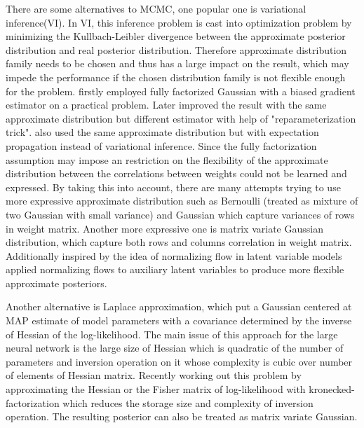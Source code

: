 There are some alternatives to MCMC, one popular one is variational inference(VI)\cite{hinton1993keeping}. In VI, this inference problem is cast into optimization problem by minimizing the Kullbach-Leibler divergence between the approximate posterior distribution and real posterior distribution. Therefore approximate distribution family needs to be chosen and thus has a large impact on the result, which may impede the performance if the chosen distribution family is not flexible enough for the problem. \cite{graves2011practical} firstly employed fully factorized Gaussian with a biased gradient estimator on a practical problem. Later \cite{blundell2015weight} improved the result with the same approximate distribution but different estimator with help of "reparameterization trick"\cite{kingma2013auto}. \citealp{hernandez2015probabilistic} also used the same approximate distribution but with expectation propagation\cite{minka2001expectation} instead of variational inference.
Since the fully factorization assumption may impose an restriction on the flexibility of the approximate distribution between the correlations between weights could not be learned and expressed. By taking this into account, there are many attempts trying to use more expressive approximate distribution such as Bernoulli (treated as mixture of two Gaussian with small variance)\cite{gal2016dropout} and Gaussian \cite{kingma2015variational} which capture variances of rows in weight matrix. Another more expressive one is matrix variate Gaussian distribution\cite{louizos2016structured}\cite{sun2017learning}\cite{zhang2017noisy}, which capture both rows and columns correlation in weight matrix. Additionally inspired by the idea of normalizing flow in latent variable models \cite{louizos2017multiplicative}applied normalizing
flows to auxiliary latent variables to produce more
flexible approximate posteriors. 


Another alternative is Laplace approximation\cite{mackay1992practical}, which put a Gaussian centered at MAP estimate of model parameters with a covariance determined by the inverse of Hessian of the log-likelihood. The main issue of this approach for the large neural network is the large size of Hessian which is quadratic of the number of parameters and inversion operation on it whose complexity is cubic over number of elements of Hessian matrix. Recently \cite{ritter2018scalable} working out this problem by approximating the Hessian or the Fisher matrix of log-likelihood with kronecked-factorization which reduces the storage size and complexity of inversion operation. The resulting posterior can also be treated as matrix variate Gaussian.  

